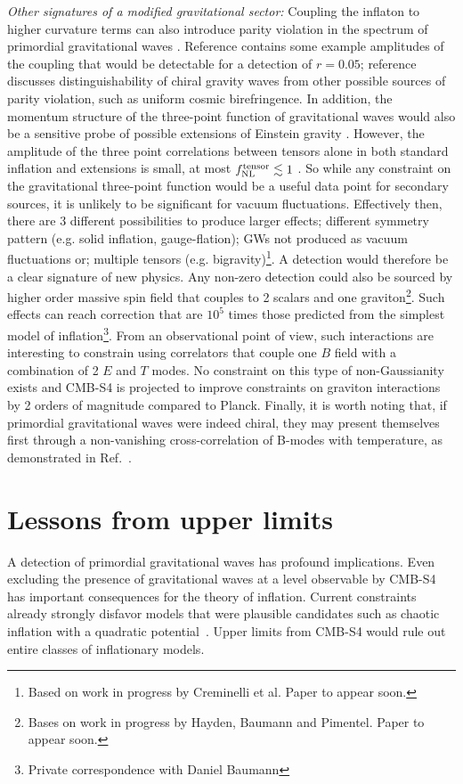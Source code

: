 {\it Other signatures of a modified gravitational sector:} Coupling the inflaton to higher curvature terms can also introduce parity violation in the spectrum of primordial gravitational waves \cite{lue99,Alexander:2004wk,Contaldi:2008yz,Takahashi:2009wc}. Reference \cite{Takahashi:2009wc} contains some example amplitudes of the coupling that would be detectable for a detection of $r=0.05$; reference \cite{2010PhRvD..81l3529G} discusses distinguishability of chiral gravity waves from other possible sources of parity violation, such as uniform cosmic birefringence. In addition, the momentum structure of the three-point function of gravitational waves would also be a sensitive probe of possible extensions of Einstein gravity \cite{Maldacena:2011nz}. However, the amplitude of the three point correlations between tensors alone in both standard inflation and extensions is small, at most $f^{\rm tensor}_{\rm NL}\lesssim 1$ \cite{Maldacena:2002vr,Maldacena:2011nz}. So while any constraint on the gravitational three-point function would be a useful data point for secondary sources, it is unlikely to be significant for vacuum fluctuations. Effectively then, there are 3 different possibilities to produce larger effects; different symmetry pattern (e.g. solid inflation, gauge-flation); GWs not produced as vacuum fluctuations or; multiple tensors (e.g. bigravity)\footnote{Based on work in progress by Creminelli et al. Paper to appear soon. }. A detection would therefore be a clear signature of new physics. Any non-zero detection could also be sourced by higher order massive spin field that couples to 2 scalars and one graviton\footnote{Bases on work in progress by Hayden, Baumann and Pimentel. Paper to appear soon.}. Such effects can reach correction that are $10^5$ times those predicted from the simplest model of inflation\footnote{Private correspondence with Daniel Baumann}. From an observational point of view, such interactions are interesting to constrain using correlators that couple one $B$ field with a combination of 2 $E$ and $T$ modes. No constraint on this type of non-Gaussianity exists and CMB-S4 is projected to improve constraints on graviton interactions by 2 orders of magnitude \cite{Meerburg2016} compared to Planck. 
Finally, it is worth noting that, if primordial gravitational waves were indeed chiral, they may present themselves first through a non-vanishing cross-correlation of B-modes with temperature, as demonstrated in Ref.~\cite{Contaldi:2008yz}.


\section{Lessons from upper limits} 
\label{sec:upperLimits}
A detection of primordial gravitational waves has profound implications. Even excluding the presence of gravitational waves at a level observable by CMB-S4 has important consequences for the theory of inflation. Current constraints already strongly disfavor models that were plausible candidates such as chaotic inflation with a quadratic potential~\cite{bicepkeckplanck15}. Upper limits from CMB-S4 would rule out entire classes of inflationary models. 

